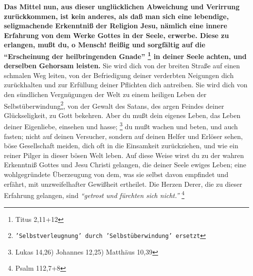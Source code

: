 \textbf{Das Mittel nun, aus dieser unglücklichen Abweichung und Verirrung zurückkommen,
ist kein anderes, als daß man sich eine lebendige, seligmachende Erkenntniß der
Religion Jesu, nämlich eine innere Erfahrung von dem Werke Gottes in der Seele,
erwerbe. Diese zu erlangen, mußt du, o Mensch! fleißig und sorgfältig auf die 
"`Erscheinung der heilbringenden Gnade"'
\footnote{Titus 2,11+12}
in deiner Seele
achten, und derselben Gehorsam leisten.} Sie wird dich von der breiten Straße auf
einen schmalen Weg leiten, von der Befriedigung deiner verderbten Neigungen dich
zurückhalten und zur Erfüllung deiner Pflichten dich antreiben. Sie wird dich
von den sündlichen Vergnügungen der Welt zu einem heiligen Leben der
Selbstüberwindung\footnote{\texttt{'Selbstverleugnung' durch 'Selbstüberwindung' ersetzt}}, von der Gewalt des Satans, des argen Feindes deiner
Glückseligkeit, zu Gott bekehren. Aber du mußt dein eigenes Leben, das Leben
deiner Eigenliebe, einsehen und hasse;
\footnote{Lukas 14,26) Johannes 12,25) Matthäus 10,39}
du mußt wachen und beten, und auch fasten; nicht auf deinen Versucher,
sondern auf deinen Helfer und Erlöser sehen, böse Gesellschaft meiden, dich oft
in die Einsamkeit zurückziehen, und wie ein reiner Pilger in dieser bösen Welt
leben. Auf diese Weise wirst du zu der wahren Erkenntniß Gottes und Jesu Christi
gelangen, die deiner Seele ewiges Leben; eine wohlgegründete Überzeugung von
dem, was sie selbst davon empfindet und erfährt, mit unzweifelhafter Gewißheit
ertheilet. Die Herzen Derer, die zu dieser Erfahrung gelangen, sind
\textit{"`getrost und fürchten sich nicht."'}
\footnote{Psalm 112,7+8}
